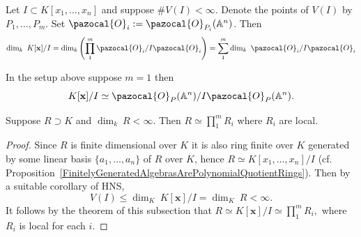   \begin{corollary}\label{DimensionOfLocalQuotientFromIdealsWithFiniteZeroes}
        Let $I\subset K[x_1,\dots,x_n]$ and suppose $\#V(I)< \infty$. Denote the points of $V(I)$ by $P_1,\dots,P_m$. Set $\pazocal{O}_i:=\pazocal{O}_{P_i}(\A^n)$. Then
        $$\dim_k \ K[\mathbf{x}]/I = \dim_k\left( \prod_1^m \pazocal{O}_i/I\pazocal{O}_i\right)= \sum_1^m \dim_k \ \pazocal{O}_i/I\pazocal{O}_i$$
  \end{corollary}
  \begin{corollary}
        In the setup above suppose $m=1$ then 
        $$K[\mathbf{x}]/I\simeq \pazocal{O}_P(\A^n)/I\pazocal{O}_P(\A^n).$$
  \end{corollary}
  \begin{corollary}
      Suppose $R\supset K$ and $\dim_k\ R < \infty$. Then $R\simeq \prod_1^m R_i$ where $R_i$ are local. 
  \end{corollary}
  \begin{proof}
       Since $R$ is finite dimensional over $K$ it is also ring finite over $K$ generated by some linear basis $\{a_1,\dots,a_n\}$ of $R$ over $K$, hence $R\simeq K[x_1,\dots, x_n]/I$ (cf. Proposition~\ref{FinitelyGeneratedAlgebrasArePolynomialQuotientRings}). Then by a suitable corollary of HNS, $$V(I)\leq \dim_K\ K[\mathbf{x}]/I=  \dim_K \ R<\infty.$$
       It follows by the theorem of this subsection that $R\simeq K[\mathbf{x}]/I \simeq \prod_1^m R_i,$
       where $R_i$ is local for each $i$.
  \end{proof}
